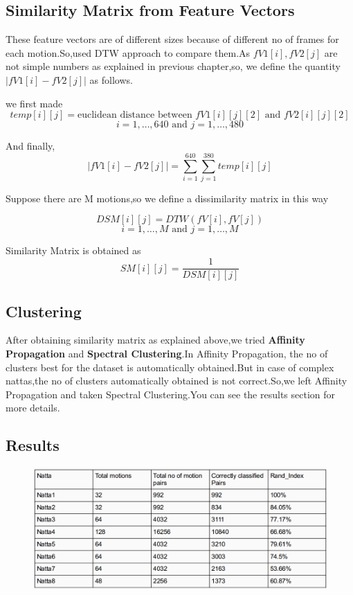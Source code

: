 \subsection{Similarity Matrix from Feature Vectors}
These feature vectors are of different sizes because of different no of frames for each motion.So,used DTW approach to compare them.As \(fV1[i],fV2[j]\) are not simple numbers as explained in previous chapter,so, we  define  the quantity \(|fV1[i]-fV2[j]|\) as follows.

we first made \[temp[i][j] = \text{euclidean distance between } fV1[i][j][2] \text{ and } fV2[i][j][2] \] 
\[i = 1,\dots,640 \text{ and } j = 1,\dots,480 \]

And finally, 
\[|fV1[i]-fV2[j]| = \sum_{i=1}^{640}\sum_{j=1}^{380}temp[i][j]\]

Suppose there are M motions,so we define a dissimilarity matrix in this way

\[DSM[i][j] = DTW(fV[i],fV[j])\]
\[i = 1,\dots,M \text{ and } j = 1,\dots,M \]

Similarity  Matrix is obtained as 
\[ SM[i][j] = \frac{1}{DSM[i][j]} \]

\subsection{Clustering}
After obtaining similarity matrix as explained above,we tried \textbf{Affinity Propagation} and \textbf{Spectral Clustering}.In Affinity Propagation, the no of clusters best for the dataset is automatically obtained.But in case of complex nattas,the no of clusters automatically obtained is not correct.So,we left Affinity Propagation and taken Spectral Clustering.You can see the results section for more details.


\subsection{Results}
\begin{figure} [!htbp]
\centering
\includegraphics[width=140mm]{Pictures/res1.png}
\end{figure}


